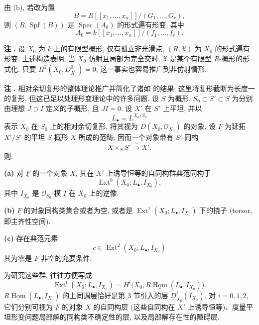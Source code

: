 由 (b), 若改为置
\[
B=R[[x_1,\ldots,x_n]]/(G_1,\ldots,G_r),
\]
则 $(R,\operatorname{Spf}(B))$ 是 $\operatorname{Spec}(A_0)$ 的形式遍有形变, 其中
\[
A_0=k[[x_1,\ldots,x_n]]/(f_1,\ldots,f_r).
\]

\medskip
\noindent\textbf{注 .}
设 $X_0$ 为 $k$ 上的有限型概形, 仅有孤立非光滑点, $(R,\mathfrak X)$ 为 $X_0$ 的形式遍有形变. 上述构造表明, 当 $X_0$ 仿射且局部为完全交时, $\mathfrak X$ 是某个有限型 $R$-概形的形式化. 只要 $H^2(X_0,\underline D^0_{X_0})=0$, 这一事实也容易推广到非仿射情形.



\medskip
\noindent\textbf{注 .}
相对余切复形的整体理论推广并简化了诸如  的结果; 这里将复形截断为长度一的复形, 但这已足以处理形变理论中的许多问题. 设 $S$ 为概形, $S_0\subset S'\subset S$ 为分别由理想 $J\supset I$ 定义的子概形, 且 $JI=0$. 设 $X'$ 在 $S'$ 上平坦, 并以
\[
L_\bullet=L^{X_0/S_0}
\]
表示 $X_0$ 在 $S_0$ 上的相对余切复形, 将其视为 $D(X_0,\mathcal O_{X_0})$ 的对象. 设 $\underline F$ 为延拓 $X'/S'$ 的平坦 $S$-概形 $X$ 所成的范畴; 因而一个对象带有 $S'$-同构
\[
X\times_SS'\xrightarrow{\ \sim\ }X'.
\]
则:

\smallskip
\noindent\textbf{(a)} 对 $\underline F$ 的一个对象 $X$, 其在 $X'$ 上诱导恒等的自同构群典范同构于
\[
\operatorname{Ext}^0(X_0;L_\bullet,I_{X_0}),
\]
其中 $I_{X_0}$ 是 $\mathcal O_{S_0}$-模 $I$ 在 $X_0$ 上的逆像.


\smallskip
\noindent\textbf{(b)} $\underline F$ 的对象同构类集合或者为空, 或者是 $\operatorname{Ext}^1(X_0;L_\bullet,I_{X_0})$ 下的挠子 (torsor, 即主齐性空间).

\smallskip
\noindent\textbf{(c)} 存在典范元素
\[
c\in\operatorname{Ext}^2(X_0;L_\bullet,I_{X_0})
\]
其为零是 $\underline F$ 非空的充要条件.

为研究这些群, 往往方便写成
\[
\operatorname{Ext}^i(X_0;L_\bullet,I_{X_0})
=H^i\bigl(X_0,R\underline{\operatorname{Hom}}
  (L_\bullet,I_{X_0})\bigr).
\]
$R\underline{\operatorname{Hom}}(L_\bullet,I_{X_0})$ 的上同调层恰好是第 3 节引入的层 $\underline D^i_{X_0}(I_{X_0})$. 对 $i=0,1,2$, 它们分别可视为 $\underline F$ 的对象 $X$ 的自同构层 (这些自同构在 $X'$ 上诱导恒等)、度量平坦形变问题局部解的同构类不确定性的层, 以及局部解存在性的障碍层.

